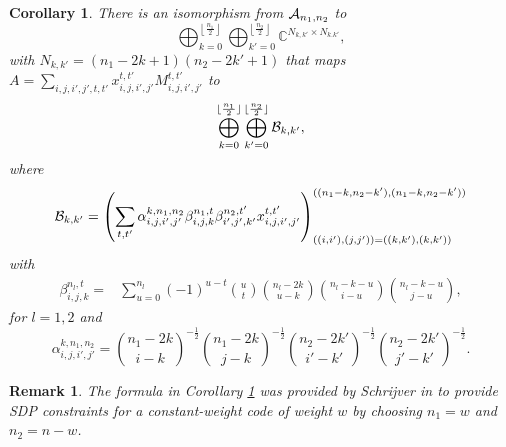 \documentclass[final,onecolumn]{IEEEtran}
\newtheorem{corollaryenv}[definitionenv]{Corollary}
\newtheorem{remarkenv}[definitionenv]{Remark}
\newenvironment{remark}{\begin{remarkenv}\rm}{\end{remarkenv}}
\newenvironment{corollary}{\begin{corollaryenv}\rm}{\end{corollaryenv}}
\theoremstyle{definition}
\begin{document}
\begin{corollary}\cite[equation $(56)$]{Sch05}
\label{cor:blo}
	There is an isomorphism from ${\cal A}_{n_{1}, n_{2}}$ to
	\begin{equation*}
		\bigoplus_{k = 0}^{\left\lfloor \frac{n_{1}}{2} \right\rfloor} \bigoplus_{k' = 0}^{\left\lfloor \frac{n_{2}}{2} \right\rfloor} \mathbb{C}^{N_{k, k'} \times N_{k. k'}}, 
	\end{equation*}
	with $N_{k, k'} = (n_{1}-2k+1)(n_{2}-2k'+1)$ that maps $A = \sum_{i, j, i', j', t, t'}x_{i, j, i', j'}^{t, t'} M_{i, j, i', j'}^{t, t'}$ to
	\begin{equation*}
		\bigoplus_{k = 0}^{\lfloor \frac{n_{1}}{2} \rfloor} \bigoplus_{k' = 0}^{\lfloor \frac{n_{2}}{2} \rfloor} {\cal B}_{k, k'}, 
	\end{equation*}
	where
	\begin{equation*}
		\begin{aligned}
			{\cal B}_{k, k'} = \left( \sum_{t, t'}  \alpha_{i, j, i', j'}^{k, n_{1}, n_{2}} \beta_{i, j, k}^{n_{1}, t} \beta_{i', j', k'}^{n_{2}, t'}  x_{i, j, i', j'}^{t, t'} \right)_{((i, i'), (j, j')) = ((k, k'), (k, k'))}^{((n_{1}-k, n_{2}-k'), (n_{1}-k, n_{2}-k'))}
		\end{aligned} 
	\end{equation*}
	with
	\begin{align*}
		\beta_{i, j, k}^{n_{l}, t} = & \sum_{u = 0}^{n_{l}} (-1)^{u-t} \binom{u}{t} \binom{n_{l}-2k}{u-k} \binom{n_{l}-k-u}{i-u} \binom{n_{l}-k-u}{j-u},
	\end{align*}
	for $l = 1, 2$ and
	\begin{equation*}
		\alpha_{i, j, i', j'}^{k, n_{1}, n_{2}} = \binom{n_{1}-2k}{i-k}^{-\frac{1}{2}} \binom{n_{1}-2k}{j-k}^{-\frac{1}{2}} \binom{n_{2}-2k'}{i'-k'}^{-\frac{1}{2}} \binom{n_{2}-2k'}{j'-k'}^{-\frac{1}{2}}.
	\end{equation*}
\end{corollary}

\begin{remark}
The formula in Corollary \ref{cor:blo} was provided by Schrijver in \cite{Sch05} to provide SDP constraints for a constant-weight code of weight $w$ by choosing $n_{1}=w$ and $n_{2}=n-w$. 
\end{remark}
	
\end{document}

